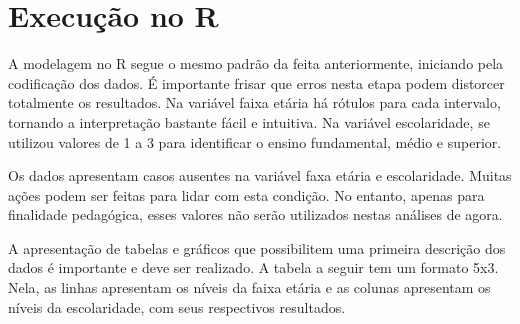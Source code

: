 \documentclass[
]{book}
\newenvironment{Shaded}{\begin{snugshade}}{\end{snugshade}}
\newcommand{\DataTypeTok}[1]{\textcolor[rgb]{0.13,0.29,0.53}{#1}}
\newcommand{\KeywordTok}[1]{\textcolor[rgb]{0.13,0.29,0.53}{\textbf{#1}}}
\newcommand{\NormalTok}[1]{#1}
\newcommand{\OperatorTok}[1]{\textcolor[rgb]{0.81,0.36,0.00}{\textbf{#1}}}
\newcommand{\StringTok}[1]{\textcolor[rgb]{0.31,0.60,0.02}{#1}}
\begin{document}
\hypertarget{execuuxe7uxe3o-no-r-7}{%
\section{Execução no R}\label{execuuxe7uxe3o-no-r-7}}

A modelagem no R segue o mesmo padrão da feita anteriormente, iniciando pela codificação dos dados. É importante frisar que erros nesta etapa podem distorcer totalmente os resultados. Na variável faixa etária há rótulos para cada intervalo, tornando a interpretação bastante fácil e intuitiva. Na variável escolaridade, se utilizou valores de 1 a 3 para identificar o ensino fundamental, médio e superior.

\begin{Shaded}
\end{Shaded}

Os dados apresentam casos ausentes na variável faxa etária e escolaridade. Muitas ações podem ser feitas para lidar com esta condição. No entanto, apenas para finalidade pedagógica, esses valores não serão utilizados nestas análises de agora.

\begin{Shaded}
\end{Shaded}

A apresentação de tabelas e gráficos que possibilitem uma primeira descrição dos dados é importante e deve ser realizado. A tabela a seguir tem um formato 5x3. Nela, as linhas apresentam os níveis da faixa etária e as colunas apresentam os níveis da escolaridade, com seus respectivos resultados.
\end{document}
